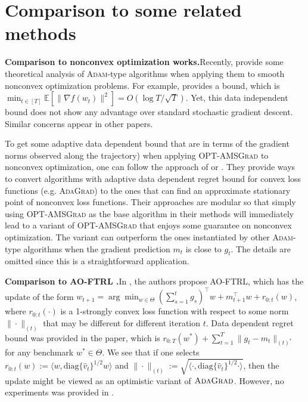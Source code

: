 \documentclass[11pt]{article}
\theoremstyle{k}
\begin{document}
\newpage

\section{Comparison to some related methods} \label{app:related}

\textbf{Comparison to nonconvex optimization works.}\hspace{0.1in}Recently, \citep{ZRSKK18,CLSH19,WWB18,ZTYCG18,ZS18,LO18} provide some theoretical analysis 
of \textsc{Adam}-type algorithms when applying them to smooth nonconvex optimization problems.
For example, \citep{CLSH19} provides a bound,
which is $\min_{t \in [T]} \mathbb{E}[\| \nabla f(w_t) \|^2 ] = O(\log T / \sqrt{T}) $.
Yet, this data independent bound does not show any advantage over standard stochastic gradient descent. Similar concerns appear in other papers.

To get some adaptive data dependent bound that are in terms of the gradient norms observed along the trajectory) when applying 
\textsc{OPT-AMSGrad} to nonconvex optimization,
one can follow the approach of \citep{Princeton18} or \citep{CYYZC19}.
They provide ways to convert algorithms with adaptive data dependent regret bound
for convex loss functions (e.g. \textsc{AdaGrad}) to the ones that can find an approximate stationary point of nonconvex loss functions. 
Their approaches are modular so that simply using \textsc{OPT-AMSGrad}
as the base algorithm in their methods will immediately lead to a variant of \textsc{OPT-AMSGrad} that enjoys some guarantee on nonconvex optimization.
The variant can outperform the ones instantiated by other \textsc{Adam}-type algorithms when
the gradient prediction $m_t$ is close to $g_t$.
The details are omitted since this is a straightforward application.

\textbf{Comparison to AO-FTRL \citep{MY16}.}\hspace{0.1in}In \citep{MY16}, the authors propose AO-FTRL, which has the update of 
the form $w_{t+1} = \arg\min_{{w \in \Theta}} ( \sum_{s=1}^t g_s )^{\top}  w + m_{t+1}^\top w + r_{0:t}(w) $, where $r_{0:t}(\cdot)$ is a 1-strongly convex loss function with respect to some norm $\| \cdot\|_{(t)}$ that may be different for different iteration $t$. 
Data dependent regret bound was provided in the paper, which is $r_{{0:T}}(w^*) + \sum_{t=1}^T \| g_t - m_t \|_{(t)^*}$ for any benchmark $w^{*} \in \Theta$. We see that if
one selects $r_{0:t}(w) := \langle w, \text{diag}\{\hat{v}_t\}^{1/2} w \rangle$ 
and $\| \cdot \|_{(t)}:= 
\sqrt{ \langle \cdot, \text{diag}\{\hat{v}_t\}^{1/2} \cdot \rangle }$, then the update might be viewed as an optimistic variant of $\textsc{AdaGrad}$. However, no experiments was provided in \citep{MY16}. 
\end{document}
